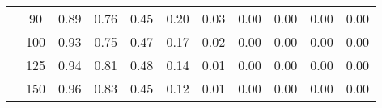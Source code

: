 \begin{table}[t]
\begin{center}
\begin{subtable}[c]{\textwidth}
\begin{center}
\begin{tabular}{rcccccccccc}
                                            & \multicolumn{1}{c|}{90}  & \num{0.89}  & \num{0.76}  & \num{0.45}  & \num{0.20}  & \num{0.03}  & \num{0.00}  & \num{0.00}  & \num{0.00}  & \num{0.00}  \\
                                            & \multicolumn{1}{c|}{100}  & \num{0.93}  & \num{0.75}  & \num{0.47}  & \num{0.17}  & \num{0.02}  & \num{0.00}  & \num{0.00}  & \num{0.00}  & \num{0.00}  \\
                                            & \multicolumn{1}{c|}{125}  & \num{0.94}  & \num{0.81}  & \num{0.48}  & \num{0.14}  & \num{0.01}  & \num{0.00}  & \num{0.00}  & \num{0.00}  & \num{0.00}  \\
                                            & \multicolumn{1}{c|}{150}  & \num{0.96}  & \num{0.83}  & \num{0.45}  & \num{0.12}  & \num{0.01}  & \num{0.00}  & \num{0.00}  & \num{0.00}  & \num{0.00}  \\
                                    \end{tabular}
            \end{center}
        \end{subtable}

        \vspace{5mm}


\end{center}
\end{table}
